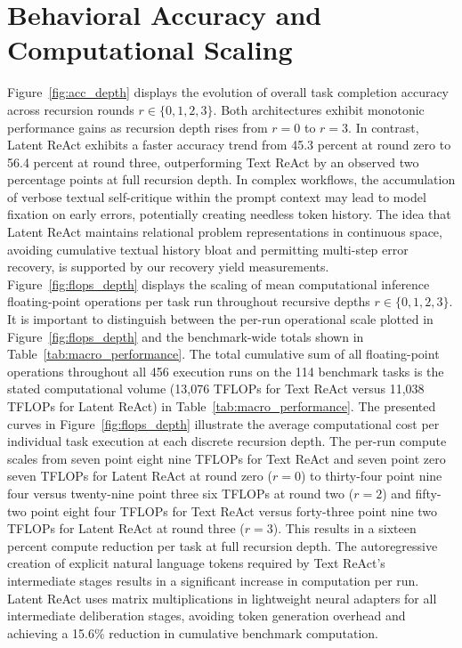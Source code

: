 \documentclass[a4paper, 12pt]{report}
\begin{document}
\section{Behavioral Accuracy and Computational Scaling}
Figure~\ref{fig:acc_depth} displays the evolution of overall task completion accuracy across recursion rounds $r \in \{0, 1, 2, 3\}$. Both architectures exhibit monotonic performance gains as recursion depth rises from $r=0$ to $r=3$. In contrast, Latent ReAct exhibits a faster accuracy trend from 45.3 percent at round zero to 56.4 percent at round three, outperforming Text ReAct by an observed two percentage points at full recursion depth. In complex workflows, the accumulation of verbose textual self-critique within the prompt context may lead to model fixation on early errors, potentially creating needless token history. The idea that Latent ReAct maintains relational problem representations in continuous space, avoiding cumulative textual history bloat and permitting multi-step error recovery, is supported by our recovery yield measurements.
Figure~\ref{fig:flops_depth} displays the scaling of mean computational inference floating-point operations per task run throughout recursive depths $r \in \{0, 1, 2, 3\}$. It is important to distinguish between the per-run operational scale plotted in Figure~\ref{fig:flops_depth} and the benchmark-wide totals shown in Table~\ref{tab:macro_performance}. The total cumulative sum of all floating-point operations throughout all 456 execution runs on the 114 benchmark tasks is the stated computational volume (13,076 TFLOPs for Text ReAct versus 11,038 TFLOPs for Latent ReAct) in Table~\ref{tab:macro_performance}. The presented curves in Figure~\ref{fig:flops_depth} illustrate the average computational cost per individual task execution at each discrete recursion depth. The per-run compute scales from seven point eight nine TFLOPs for Text ReAct and seven point zero seven TFLOPs for Latent ReAct at round zero ($r=0$) to thirty-four point nine four versus twenty-nine point three six TFLOPs at round two ($r=2$) and fifty-two point eight four TFLOPs for Text ReAct versus forty-three point nine two TFLOPs for Latent ReAct at round three ($r=3$). This results in a sixteen percent compute reduction per task at full recursion depth. The autoregressive creation of explicit natural language tokens required by Text ReAct's intermediate stages results in a significant increase in computation per run. Latent ReAct uses matrix multiplications in lightweight neural adapters for all intermediate deliberation stages, avoiding token generation overhead and achieving a 15.6\% reduction in cumulative benchmark computation.
\end{document}

